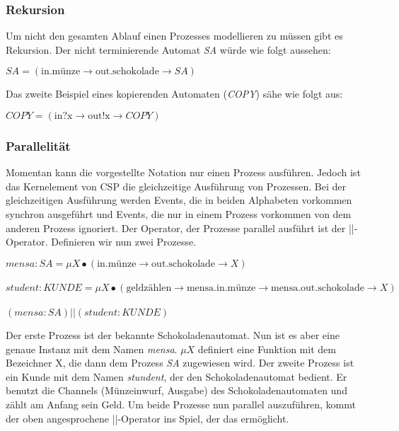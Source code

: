 \subsubsection{Rekursion}
Um nicht den gesamten Ablauf einen Prozesses modellieren zu müssen gibt es Rekursion. Der nicht terminierende Automat \textit{SA} würde wie folgt aussehen:
\begin{addmargin}[1cm]{0cm}
$SA = (\text{in.münze} \rightarrow \text{out.schokolade} \rightarrow SA)$
\end{addmargin}

Das zweite Beispiel eines kopierenden Automaten (\textit{COPY}) sähe wie folgt aus:

\begin{addmargin}[1cm]{0cm}
$COPY = (\text{in?x} \rightarrow \text{out!x} \rightarrow COPY)$
\end{addmargin}

\subsubsection{Parallelität}
Momentan kann die vorgestellte Notation nur einen Prozess ausführen. Jedoch ist das Kernelement von \ac{CSP} die gleichzeitige Ausführung von Prozessen. Bei der gleichzeitigen Ausführung werden Events, die in beiden Alphabeten vorkommen synchron ausgeführt und Events, die nur in einem Prozess vorkommen von dem anderen Prozess ignoriert. Der Operator, der Prozesse parallel ausführt ist der ||-Operator. Definieren wir nun zwei Prozesse.

\begin{addmargin}[1cm]{0cm}
$mensa:SA = \mu X \bullet (\text{in.münze} \rightarrow \text{out.schokolade} \rightarrow X)$\\\\
$student:KUNDE = \mu X \bullet (\text{geldzählen} \rightarrow \text{mensa.in.münze} \rightarrow \text{mensa.out.schokolade} \rightarrow  X)$\\\\
$ (mensa:SA) || (student:KUNDE) $
\end{addmargin}

Der erste Prozess ist der bekannte Schokoladenautomat. Nun ist es aber eine genaue Instanz mit dem Namen \textit{mensa}. $\mu X$ definiert eine Funktion mit dem Bezeichner X, die dann dem Prozess \textit{SA} zugewiesen wird.
Der zweite Prozess ist ein Kunde mit dem Namen \textit{stundent}, der den Schokoladenautomat bedient. Er benutzt die Channels (Münzeinwurf, Ausgabe) des Schokoladenautomaten und zählt am Anfang sein Geld. Um beide Prozesse nun parallel auszuführen, kommt der oben angesprochene ||-Operator ins Spiel, der das ermöglicht.

